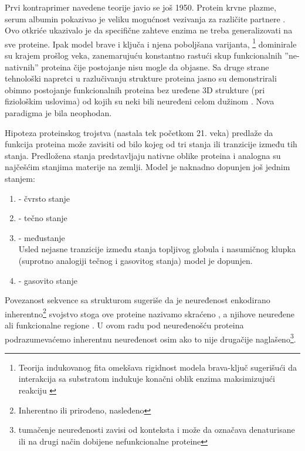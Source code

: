Prvi kontraprimer navedene teorije javio se još 1950. Protein krvne plazme, serum
albumin pokazivao je veliku mogućnost vezivanja za različite
partnere \parencite{dunker2001}. Ovo otkriće ukazivalo je da specifične zahteve
enzima ne treba generalizovati na sve proteine. Ipak model brave i ključa i
njena poboljšana varijanta, \footnote{ Teorija
indukovanog fita omekšava rigidnost modela brava-ključ sugerišući da interakcija
sa substratom indukuje konačni oblik enzima maksimizujući
reakciju \parencite{biology}}  dominirale su krajem
prošlog veka, zanemarujuću konstantno rastući skup funkcionalnih
''ne-nativnih'' proteina čije postojanje nisu mogle da objasne. Sa druge strane
tehnološki napretci u razlučivanju strukture proteina jasno su demonstrirali
obimno postojanje funkcionalnih proteina bez uređene 3D strukture (pri
fiziološkim uslovima)  od kojih su neki bili neuređeni celom
dužinom \parencite{dunker2001}.  Nova paradigma je bila neophodan.

Hipoteza proteinskog trojstva \parencite{dunker2001} (nastala tek početkom
21. veka) predlaže da funkcija proteina može zavisiti od bilo kojeg od tri
stanja ili tranzicije između tih stanja. Predložena stanja predstavljaju
nativne oblike proteina i analogna su najčešćim stanjima materije na zemlji.
Model je naknadno dopunjen još jednim stanjem:
\begin{enumerate}
  \item {} - čvrsto stanje

  \item {}  - tečno stanje

  \item {}  - međustanje\\ 
    Usled nejasne tranzicije između stanja topljivog globula i nasumičnog
    klupka (suprotno analogiji tečnog i gasovitog stanja) \parencite{dunker2001}
    model je dopunjen.

  \item {}  - gasovito stanje
\end{enumerate}

Povezanost sekvence sa strukturom sugeriše da je neuređenost enkodirano
inherentno\footnote{ Inherentno ili prirođeno, nasleđeno} svojstvo \parencite{dunker2001}
stoga ove proteine nazivamo 
 skraćeno , a njihove neuređene
ali funkcionalne regione  \parencite{uversky2016}. U ovom radu pod
neuređenošću proteina podrazumevaćemo inherentnu neuređenost osim ako to nije
drugačije naglašeno\footnote{ tumačenje neuređenosti zavisi od konteksta i može
  da označava denaturisane ili na drugi način dobijene nefunkcionalne
proteine}.

